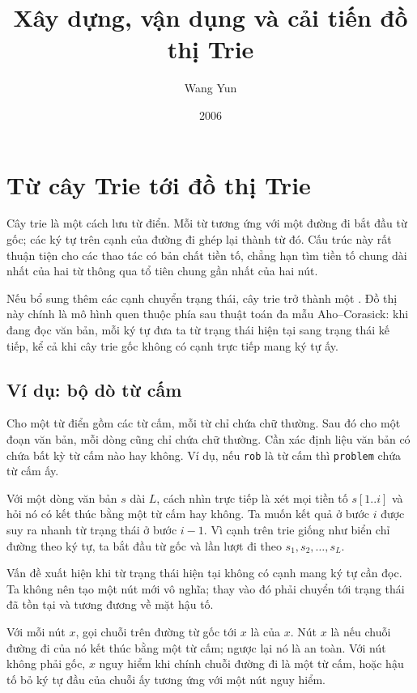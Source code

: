 \documentclass[11pt]{article}
\title{Xây dựng, vận dụng và cải tiến đồ thị Trie}
\author{Wang Yun}
\date{2006}
\begin{document}
\maketitle


\section{Từ cây Trie tới đồ thị Trie}

Cây trie là một cách lưu từ điển. Mỗi từ tương ứng với một đường đi bắt đầu từ
gốc; các ký tự trên cạnh của đường đi ghép lại thành từ đó. Cấu trúc này rất
thuận tiện cho các thao tác có bản chất tiền tố, chẳng hạn tìm tiền tố chung
dài nhất của hai từ thông qua tổ tiên chung gần nhất của hai nút.

Nếu bổ sung thêm các cạnh chuyển trạng thái, cây trie trở thành một
. Đồ thị này chính là mô hình quen thuộc phía sau thuật toán
đa mẫu Aho--Corasick: khi đang đọc văn bản, mỗi ký tự đưa ta từ trạng thái hiện
tại sang trạng thái kế tiếp, kể cả khi cây trie gốc không có cạnh trực tiếp
mang ký tự ấy.

\subsection{Ví dụ: bộ dò từ cấm}

Cho một từ điển gồm các từ cấm, mỗi từ chỉ chứa chữ thường. Sau đó cho một
đoạn văn bản, mỗi dòng cũng chỉ chứa chữ thường. Cần xác định liệu văn bản có
chứa bất kỳ từ cấm nào hay không. Ví dụ, nếu \texttt{rob} là từ cấm thì
\texttt{problem} chứa từ cấm ấy.

Với một dòng văn bản \(s\) dài \(L\), cách nhìn trực tiếp là xét mọi tiền tố
\(s[1..i]\) và hỏi nó có kết thúc bằng một từ cấm hay không. Ta muốn kết quả ở
bước \(i\) được suy ra nhanh từ trạng thái ở bước \(i-1\). Vì cạnh trên trie
giống như biển chỉ đường theo ký tự, ta bắt đầu từ gốc và lần lượt đi theo
\(s_1,s_2,\ldots,s_L\).

Vấn đề xuất hiện khi từ trạng thái hiện tại không có cạnh mang ký tự cần đọc.
Ta không nên tạo một nút mới vô nghĩa; thay vào đó phải chuyển tới trạng thái
đã tồn tại và tương đương về mặt hậu tố.

Với mỗi nút \(x\), gọi chuỗi trên đường từ gốc tới \(x\) là
 của \(x\). Nút \(x\) là  nếu chuỗi đường
đi của nó kết thúc bằng một từ cấm; ngược lại nó là an toàn. Với nút không
phải gốc, \(x\) nguy hiểm khi chính chuỗi đường đi là một từ cấm, hoặc hậu tố
bỏ ký tự đầu của chuỗi ấy tương ứng với một nút nguy hiểm.
\end{document}
